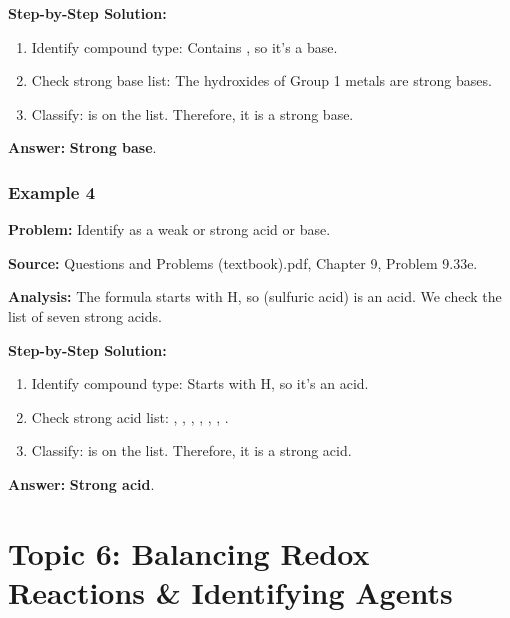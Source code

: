 \documentclass{article}
\begin{document}
\textbf{Step-by-Step Solution:}
\begin{enumerate}
    \item Identify compound type: Contains , so it's a base.
    \item Check strong base list: The hydroxides of Group 1 metals are strong bases.
    \item Classify:  is on the list. Therefore, it is a strong base.
\end{enumerate}

\textbf{Answer:} \textbf{Strong base}.

\subsubsection{Example 4}
\textbf{Problem:} Identify  as a weak or strong acid or base.

\textbf{Source:} Questions and Problems (textbook).pdf, Chapter 9, Problem 9.33e.

\textbf{Analysis:} The formula starts with H, so  (sulfuric acid) is an acid. We check the list of seven strong acids.

\textbf{Step-by-Step Solution:}
\begin{enumerate}
    \item Identify compound type: Starts with H, so it's an acid.
    \item Check strong acid list: , , , , , , .
    \item Classify:  is on the list. Therefore, it is a strong acid.
\end{enumerate}

\textbf{Answer:} \textbf{Strong acid}.

\section{Topic 6: Balancing Redox Reactions \& Identifying Agents}
\end{document}
